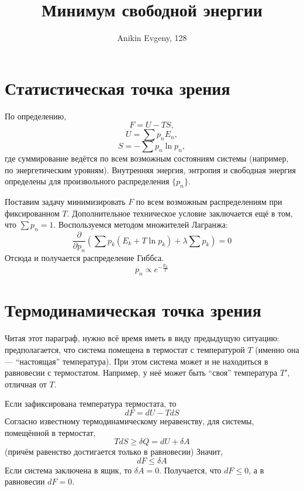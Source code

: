 \documentclass{article}
\title{Минимум свободной энергии}
\author{Anikin Evgeny, 128}
\begin{document}
\maketitle
\section{Статистическая точка зрения}
По определению,
\begin{equation}
	\label{free_energy}
	F = U - TS,
\end{equation}
\begin{equation}
	U = \sum p_n E_n,
\end{equation}
\begin{equation}
	S = -\sum p_n \ln{p_n},
\end{equation}
где суммирование ведётся по всем возможным состояниям системы (например, по энергетическим
уровням). Внутренняя энергия, энтропия и свободная энергия определены для произвольного
распределения $\{p_n\}$. 

Поставим задачу минимизировать $F$ по всем возможным распределениям при фиксированном $T$.
Дополнительное техническое условие заключается ещё в том, что $\sum p_n = 1$. Воспользуемся
методом множителей Лагранжа:
\begin{equation}
	\frac{\partial}{\partial p_n}\left(\sum p_k(E_k+T\ln{p_k})+\lambda\sum p_k\right)=0
\end{equation}
Отсюда и получается распределение Гиббса.
\begin{equation}
	p_n \propto e^{-\frac{E_n}{T}}
\end{equation}
\section{Термодинамическая точка зрения}
Читая этот параграф, нужно всё время иметь в виду предыдущую ситуацию:
предполагается, что система помещена в термостат с температурой $T$ (именно она --- 
``настоящая'' температура). При этом система может и не находиться в равновесии с термостатом. 
Например, у неё может быть ``своя'' температура $T'$, отличная от $T$.
 
Если зафиксирована температура термостата, то
\begin{equation}
	dF = dU - TdS
\end{equation}
Согласно известному термодинамическому неравенству, для системы, помещённой в термостат,
\begin{equation}
	\label{famous_ineq}
	TdS \ge \delta Q = dU + \delta A
\end{equation}
(причём равенство достигается только в равновесии)
Значит,
\begin{equation}
	dF \le \delta A
\end{equation}
Если система заключена в ящик, то $\delta A = 0$. Получается, что $dF \le 0$, а в равновесии
$dF = 0$.
\end{document}
